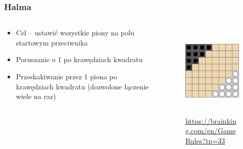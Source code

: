 \documentclass{beamer}
\begin{document}
\begin{frame}
	\frametitle{Halma}
	\begin{columns}
		\begin{column}{.48\textwidth}
			\begin{itemize}
				\item Cel -- ustawić wszystkie piony na polu startowym przeciwnika
				\item Poruszanie o 1 po  krawędziach kwadratu
				\item Przeskakiwanie przez 1 piona po krawędziach kwadratu (dozwolone łączenie wiele na raz)
			\end{itemize}
		\end{column}%
		\hfill
		\begin{column}{.60\textwidth}
			\begin{figure}
				\includegraphics[height=4.5cm]{halma.png}
				\centering
				\caption{\url{https://brainking.com/en/GameRules?tp=33}}
			\end{figure}
		\end{column}
	\end{columns}
\end{frame}
\end{document}
